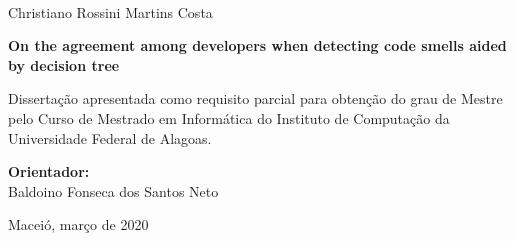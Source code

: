 \begin{center}
    \
    \vspace{2.2cm}

    \Large Christiano Rossini Martins Costa

    \vspace*{2.2cm}

    \LARGE \textbf{On the agreement among developers when detecting code smells aided by decision tree}

    \vspace*{2.2cm}

    {\hfill \normalsize \begin{minipage}{10cm}
        {\normalsize{Dissertação apresentada como requisito parcial para obtenção do grau de Mestre pelo Curso de Mestrado em Informática do Instituto de Computação da Universidade Federal de Alagoas.}}%
    \end{minipage}}

    \vspace*{3.2cm}
    \begin{flushright}
        \Large{\textbf{Orientador:}}\\ \vspace{0.2cm}
        \Large{Baldoino Fonseca dos Santos Neto}
        

        \vfill

        \normalsize{Maceió, março de 2020}\\ %

    \end{flushright}
\end{center}